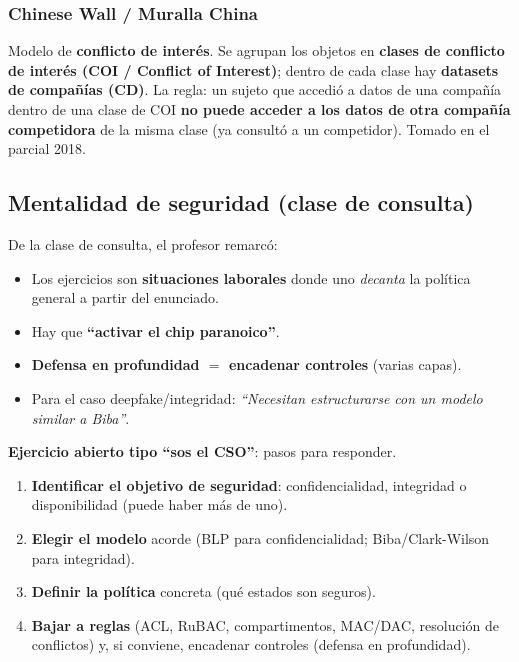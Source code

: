 \documentclass[../main.tex]{subfiles}
\begin{document}
\subsubsection{Chinese Wall / Muralla China}

Modelo de \textbf{conflicto de interés}. Se agrupan los objetos en \textbf{clases de conflicto de interés (COI / Conflict of Interest)}; dentro de cada clase hay \textbf{datasets de compañías (CD)}. La regla: un sujeto que accedió a datos de una compañía dentro de una clase de COI \textbf{no puede acceder a los datos de otra compañía competidora} de la misma clase (ya consultó a un competidor). Tomado en el parcial 2018.

\subsection{Mentalidad de seguridad (clase de consulta)}

\begin{destacado}
De la clase de consulta, el profesor remarcó:
\begin{itemize}[nosep]
  \item Los ejercicios son \textbf{situaciones laborales} donde uno \emph{decanta} la política general a partir del enunciado.
  \item Hay que \textbf{``activar el chip paranoico''}.
  \item \textbf{Defensa en profundidad $=$ encadenar controles} (varias capas).
  \item Para el caso deepfake/integridad: \emph{``Necesitan estructurarse con un modelo similar a Biba''}.
\end{itemize}
\end{destacado}

\begin{examen}
\textbf{Ejercicio abierto tipo ``sos el CSO''}: pasos para responder.
\begin{enumerate}[nosep]
  \item \textbf{Identificar el objetivo de seguridad}: confidencialidad, integridad o disponibilidad (puede haber más de uno).
  \item \textbf{Elegir el modelo} acorde (BLP para confidencialidad; Biba/Clark-Wilson para integridad).
  \item \textbf{Definir la política} concreta (qué estados son seguros).
  \item \textbf{Bajar a reglas} (ACL, RuBAC, compartimentos, MAC/DAC, resolución de conflictos) y, si conviene, encadenar controles (defensa en profundidad).
\end{enumerate}
\end{examen}
\end{document}
